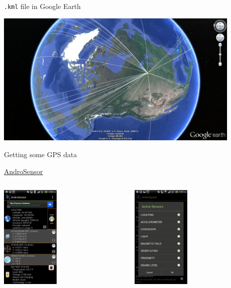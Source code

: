 \documentclass[sans,aspectratio=169,presentation,bigger,fleqn]{beamer}
\begin{document}
\begin{frame}[fragile,label=sec-24]{\texttt{.kml} file in Google Earth}
 \begin{center}
\includegraphics[height=6.5cm]{./img/talks-w-gcircles-kml.png}
\end{center}
\end{frame}
\begin{frame}[label=sec-25]{Getting some GPS data}
\begin{center}
\href{https://play.google.com/store/apps/details?id=com.fivasim.androsensor&hl=en}{\uline{AndroSensor}}
\end{center}

\begin{columns}
\begin{column}{0.45\textwidth}
\begin{center}
\includegraphics[height=5cm]{./img/andro-main.png}
\end{center}
\end{column}
\begin{column}{0.45\textwidth}
\begin{center}
\includegraphics[height=5cm]{./img/andro-sensors.png}
\end{center}
\end{column}
\end{columns}
\end{frame}
\end{document}
